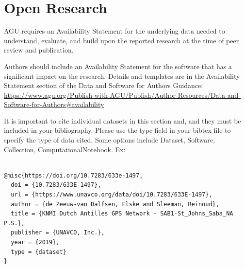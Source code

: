 \documentclass[draft]{agujournal2019}
\begin{document}
%
%

%

%



\section{Open Research}
AGU requires an Availability Statement for the underlying data needed to understand, evaluate, and build upon the reported research at the time of peer review and publication.

Authors should include an Availability Statement for the software that has a significant impact on the research. Details and templates are in the Availability Statement section of the Data and Software for Authors Guidance: \url{https://www.agu.org/Publish-with-AGU/Publish/Author-Resources/Data-and-Software-for-Authors#availability}

It is important to cite individual datasets in this section and, and they must be included in your bibliography. Please use the type field in your bibtex file to specify the type of data cited. Some options include Dataset, Software, Collection, ComputationalNotebook. Ex: 
\\
\begin{verbatim}

@misc{https://doi.org/10.7283/633e-1497,
  doi = {10.7283/633E-1497},
  url = {https://www.unavco.org/data/doi/10.7283/633E-1497},
  author = {de Zeeuw-van Dalfsen, Elske and Sleeman, Reinoud},
  title = {KNMI Dutch Antilles GPS Network - SAB1-St_Johns_Saba_NA P.S.},
  publisher = {UNAVCO, Inc.},
  year = {2019},
  type = {dataset}
}

\end{verbatim}
\end{document}
